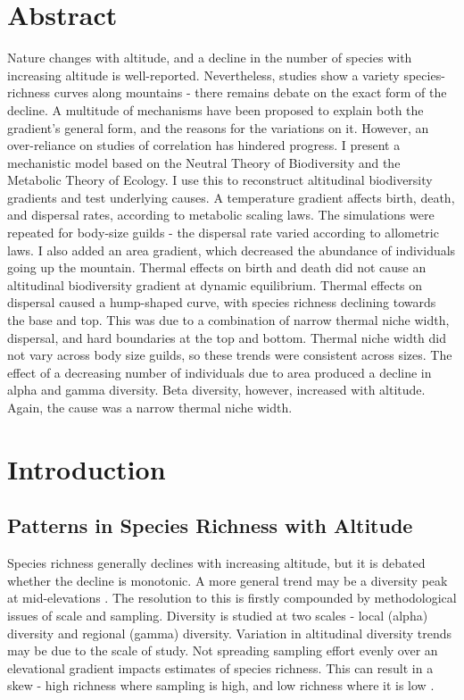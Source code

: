 \documentclass[11pt]{article}
\begin{document}
\section*{Abstract}
Nature changes with altitude, and a decline in the number of species with increasing altitude is well-reported. Nevertheless, studies show a variety species-richness curves along mountains - there remains debate on the exact form of the decline. A multitude of mechanisms have been proposed to explain both the gradient’s general form, and the reasons for the variations on it. However, an over-reliance on studies of correlation has hindered progress. I present a mechanistic model based on the Neutral Theory of Biodiversity and the Metabolic Theory of Ecology. I use this to reconstruct altitudinal biodiversity gradients and test underlying causes. A temperature gradient affects birth, death, and dispersal rates, according to metabolic scaling laws. The simulations were repeated for body-size guilds - the dispersal rate varied according to allometric laws. I also added an area gradient, which decreased the abundance of individuals going up the mountain. Thermal effects on birth and death did not cause an altitudinal biodiversity gradient at dynamic equilibrium. Thermal effects on dispersal caused a hump-shaped curve, with species richness declining towards the base and top. This was due to a combination of narrow thermal niche width, dispersal, and hard boundaries at the top and bottom. Thermal niche width did not vary across body size guilds, so these trends were consistent across sizes. The effect of a decreasing number of individuals due to area produced a decline in alpha and gamma diversity. Beta diversity, however, increased with altitude. Again, the cause was a narrow thermal niche width.

\newpage
\section*{Introduction}
\subsection*{Patterns in Species Richness with Altitude}
Species richness generally declines with increasing altitude, but it is debated whether the decline is monotonic. A more general trend may be a diversity peak at mid-elevations \cite{McCain2010a, rahbek2005role}. The resolution to this is firstly compounded by methodological issues of scale and sampling. Diversity is studied at two scales - local (alpha) diversity and regional (gamma) diversity. Variation in altitudinal diversity trends may be due to the scale of study. Not spreading sampling effort evenly over an elevational gradient impacts estimates of species richness. This can result in a skew - high richness where sampling is high, and low richness where it is low \cite{McCain2010a, rahbek2005role}.
\end{document}
